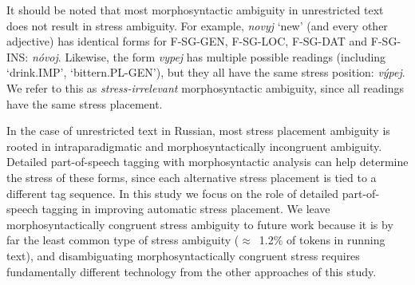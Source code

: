 \documentclass[11pt]{article}
\newcommand{\rr}[1]{\marginpar{\scriptsize R: #1}} %
\begin{document}

It should be noted that most morphosyntactic ambiguity in unrestricted text
does not result in stress ambiguity. For example, \emph{novyj} `new' (and every 
other adjective) has identical forms for F-SG-GEN, F-SG-LOC, F-SG-DAT and F-SG-
INS: \emph{n\'{o}voj}. Likewise, the form \emph{vypej} has multiple possible 
readings (including `drink.IMP', `bittern.PL-GEN'), but they all have the same 
stress position: \emph{v\'{y}pej}. We refer to this as \emph{stress-irrelevant} 
morphosyntactic ambiguity, since all readings have the same stress placement. 

In the case of unrestricted text in Russian, most stress placement 
ambiguity is rooted in intraparadigmatic and morphosyntactically incongruent 
ambiguity. Detailed part-of-speech tagging with morphosyntactic analysis
can help determine the stress of these forms, since each alternative stress 
placement is tied to a different tag sequence. In this study we focus on 
the role of detailed part-of-speech tagging in improving
automatic stress placement. We leave morphosyntactically congruent stress 
ambiguity to future work because it is by far the least common type of stress
ambiguity ($\approx$~1.2\% of tokens in running text), and disambiguating morphosyntactically congruent stress requires 
fundamentally different technology from the other approaches of this study.
\end{document}
